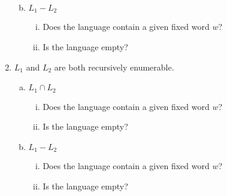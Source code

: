 \begin{enumerate}[1.]
\begin{enumerate}[a.]
\begin{enumerate}[i.]
        \end{enumerate}
        \item \(L_1 - L_2\)
        \begin{enumerate}[i.]
            \item Does the language contain a given fixed word \(w\)?
            \item Is the language empty?
        \end{enumerate}
    \end{enumerate}
    \item \(L_1\) and \(L_2\) are both recursively enumerable.
    \begin{enumerate}[a.]
        \item \(L_1 \cap L_2\)
        \begin{enumerate}[i.]
            \item Does the language contain a given fixed word \(w\)?
            \item Is the language empty?
        \end{enumerate}
        \item \(L_1 - L_2\)
        \begin{enumerate}[i.]
            \item Does the language contain a given fixed word \(w\)?
            \item Is the language empty?
        \end{enumerate}
    \end{enumerate}
\end{enumerate}